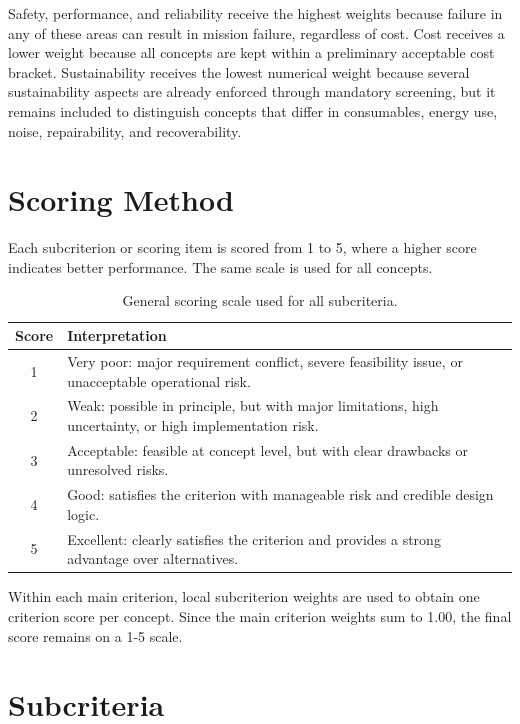 Safety, performance, and reliability receive the highest weights because
failure in any of these areas can result in mission failure, regardless
of cost. Cost receives a lower weight because all concepts are kept
within a preliminary acceptable cost bracket. Sustainability receives the
lowest numerical weight because several sustainability aspects are
already enforced through mandatory screening, but it remains included to
distinguish concepts that differ in consumables, energy use, noise,
repairability, and recoverability.


\section{Scoring Method}

Each subcriterion or scoring item is scored from 1 to 5, where a higher
score indicates better performance. The same scale is used for all
concepts.

\begin{table}[H]
\centering
\small
\caption{General scoring scale used for all subcriteria.}
\label{tab:scoring_scale}
\begin{tabularx}{0.95\textwidth}{c X}
\toprule
\textbf{Score} & \textbf{Interpretation} \\
\midrule
1 & Very poor: major requirement conflict, severe feasibility issue, or unacceptable operational risk. \\
2 & Weak: possible in principle, but with major limitations, high uncertainty, or high implementation risk. \\
3 & Acceptable: feasible at concept level, but with clear drawbacks or unresolved risks. \\
4 & Good: satisfies the criterion with manageable risk and credible design logic. \\
5 & Excellent: clearly satisfies the criterion and provides a strong advantage over alternatives. \\
\bottomrule
\end{tabularx}
\end{table}

Within each main criterion, local subcriterion weights are used to obtain
one criterion score per concept. Since the main
criterion weights sum to 1.00, the final score remains on a 1-5 scale.





\section{Subcriteria}

